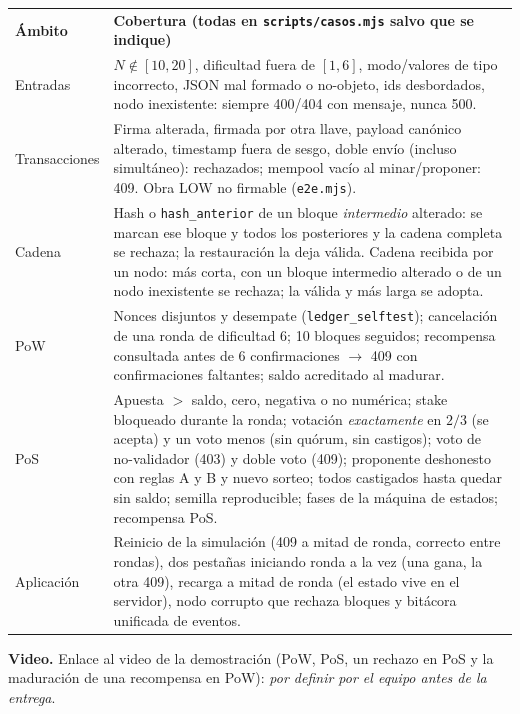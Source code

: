 \documentclass[11pt]{article}
\theoremstyle{remark}
\begin{document}
\begin{center}
\small
\begin{tabular}{p{3.0cm}p{12.4cm}}
\textbf{Ámbito} & \textbf{Cobertura (todas en \texttt{scripts/casos.mjs} salvo que se indique)} \\
Entradas & $N\notin[10,20]$, dificultad fuera de $[1,6]$, modo/valores de tipo incorrecto, JSON mal formado o no-objeto, ids
desbordados, nodo inexistente: siempre 400/404 con mensaje, nunca 500. \\
Transacciones & Firma alterada, firmada por otra llave, payload canónico alterado, timestamp fuera de sesgo, doble envío (incluso
simultáneo): rechazados; mempool vacío al minar/proponer: 409. Obra LOW no firmable (\texttt{e2e.mjs}). \\
Cadena & Hash o \texttt{hash\_anterior} de un bloque \emph{intermedio} alterado: se marcan ese bloque y todos los posteriores y la
cadena completa se rechaza; la restauración la deja válida. Cadena recibida por un nodo: más corta, con un bloque intermedio
alterado o de un nodo inexistente se rechaza; la válida y más larga se adopta. \\
PoW & Nonces disjuntos y desempate (\texttt{ledger\_selftest}); cancelación de una ronda de dificultad 6; 10 bloques seguidos;
recompensa consultada antes de 6 confirmaciones $\to$ 409 con confirmaciones faltantes; saldo acreditado al madurar. \\
PoS & Apuesta $>$ saldo, cero, negativa o no numérica; stake bloqueado durante la ronda; votación \emph{exactamente} en $2/3$ (se
acepta) y un voto menos (sin quórum, sin castigos); voto de no-validador (403) y doble voto (409); proponente deshonesto con
reglas A y B y nuevo sorteo; todos castigados hasta quedar sin saldo; semilla reproducible; fases de la máquina de estados;
recompensa PoS. \\
Aplicación & Reinicio de la simulación (409 a mitad de ronda, correcto entre rondas), dos pestañas iniciando ronda a la vez (una
gana, la otra 409), recarga a mitad de ronda (el estado vive en el servidor), nodo corrupto que rechaza bloques y bitácora
unificada de eventos. \\
\end{tabular}
\end{center}

\textbf{Video.} Enlace al video de la demostración (PoW, PoS, un rechazo en PoS y la maduración de una recompensa en PoW):
\emph{por definir por el equipo antes de la entrega}.
\end{document}
